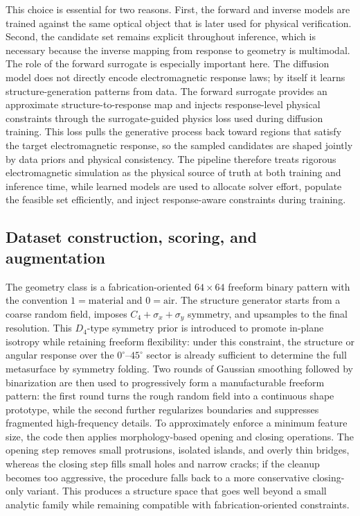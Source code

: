 This choice is essential for two reasons. First, the forward and inverse models are trained against the same optical object that is later used for physical verification. Second, the candidate set remains explicit throughout inference, which is necessary because the inverse mapping from response to geometry is multimodal. The role of the forward surrogate is especially important here. The diffusion model does not directly encode electromagnetic response laws; by itself it learns structure-generation patterns from data. The forward surrogate provides an approximate structure-to-response map and injects response-level physical constraints through the surrogate-guided physics loss used during diffusion training. This loss pulls the generative process back toward regions that satisfy the target electromagnetic response, so the sampled candidates are shaped jointly by data priors and physical consistency. The pipeline therefore treats rigorous electromagnetic simulation as the physical source of truth at both training and inference time, while learned models are used to allocate solver effort, populate the feasible set efficiently, and inject response-aware constraints during training.

\subsection{Dataset construction, scoring, and augmentation}

The geometry class is a fabrication-oriented $64\times64$ freeform binary pattern with the convention $1=\mathrm{material}$ and $0=\mathrm{air}$. The structure generator starts from a coarse random field, imposes $C_4+\sigma_x+\sigma_y$ symmetry, and upsamples to the final resolution. This $D_4$-type symmetry prior is introduced to promote in-plane isotropy while retaining freeform flexibility: under this constraint, the structure or angular response over the $0^{\circ}$--$45^{\circ}$ sector is already sufficient to determine the full metasurface by symmetry folding. Two rounds of Gaussian smoothing followed by binarization are then used to progressively form a manufacturable freeform pattern: the first round turns the rough random field into a continuous shape prototype, while the second further regularizes boundaries and suppresses fragmented high-frequency details. To approximately enforce a minimum feature size, the code then applies morphology-based opening and closing operations. The opening step removes small protrusions, isolated islands, and overly thin bridges, whereas the closing step fills small holes and narrow cracks; if the cleanup becomes too aggressive, the procedure falls back to a more conservative closing-only variant. This produces a structure space that goes well beyond a small analytic family while remaining compatible with fabrication-oriented constraints.


